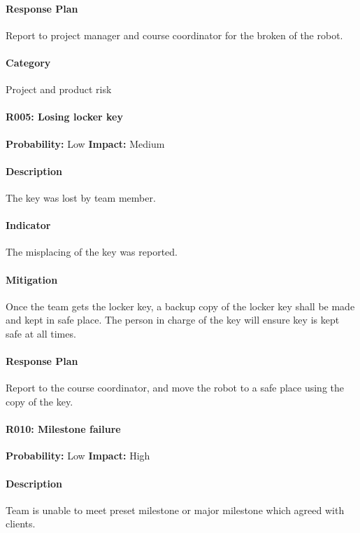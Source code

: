 \documentclass[11pt, a4paper]{report}
\begin{document}
	\paragraph{Response Plan}Report to project manager and course coordinator for the broken of the robot.\\
	\paragraph{Category} Project and product risk

\paragraph{R005: Losing locker key} \hspace{1cm} \textbf{Probability: }Low\hspace{1cm}   \textbf{Impact: }Medium
	\paragraph{Description}The key was lost by team member. 
	\paragraph{Indicator}The misplacing of the key was reported.
	\paragraph{Mitigation}Once the team gets the locker key, a backup copy of the locker key shall be made and kept in safe place. The person in charge of the key will ensure key is kept safe at all times.
	\paragraph{Response Plan}Report to the course coordinator, and move the robot to a safe place using the copy of the key.\\
	\paragraph{R010: Milestone failure} \hspace{1cm} \textbf{Probability: }Low\hspace{1cm}   \textbf{Impact: }High
	\paragraph{Description}Team is unable to meet preset milestone or major milestone which agreed with clients.
\end{document}
